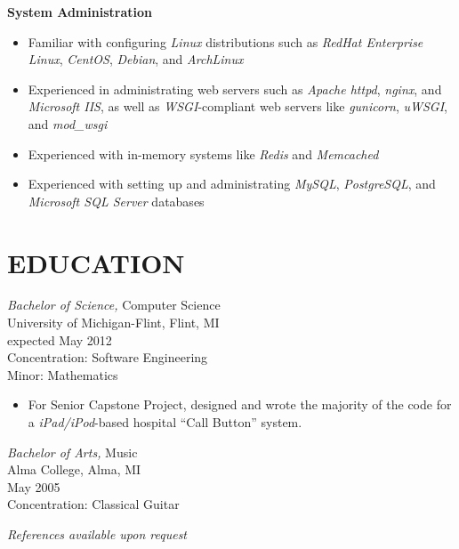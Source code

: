 \documentclass[line,margin]{res}
\begin{document}
\begin{resume}
\textbf{System Administration}
\vspace{2 mm}
\begin{itemize}
    \item Familiar with configuring {\sl Linux} distributions such as {\sl RedHat
            Enterprise Linux}, {\sl CentOS}, {\sl Debian}, and {\sl ArchLinux}
    \item Experienced in administrating web servers such as {\sl Apache httpd},
            {\sl nginx}, and {\sl Microsoft IIS}, as well as
            {\sl WSGI}-compliant web servers like {\sl gunicorn},
            {\sl uWSGI}, and {\sl mod\_wsgi}
    \item Experienced with in-memory systems like {\sl Redis} and {\sl Memcached}
    \item Experienced with setting up and administrating {\sl MySQL},
            {\sl PostgreSQL}, and {\sl Microsoft SQL Server} databases
\end{itemize}

\section{EDUCATION} {\sl Bachelor of Science,} Computer Science \\
                University of Michigan-Flint, Flint, MI \\
                expected May 2012 \\
                Concentration: Software Engineering \\
                Minor: Mathematics
                \vspace{2 mm}
                \begin{itemize}
                    \item For Senior Capstone Project, designed and wrote 
                            the majority of the code for a
                            {\sl iPad/iPod}-based hospital ``Call Button''
                            system.
                \end{itemize}

                {\sl Bachelor of Arts,} Music \\
                Alma College, Alma, MI \\
                May 2005 \\
                Concentration: Classical Guitar

\vspace{30 mm}


\end{resume}

\begin{flushleft}
{\sl References available upon request}
\end{flushleft}
\end{document}
